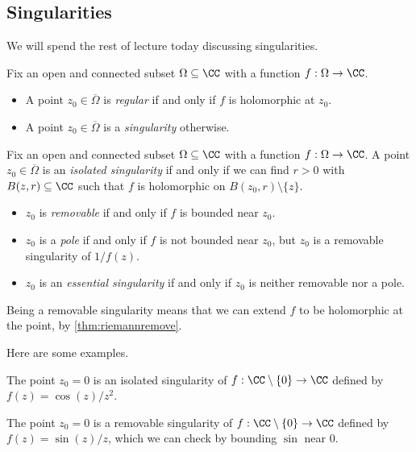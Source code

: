 \subsection{Singularities}
We will spend the rest of lecture today discussing singularities.
\begin{definition}
	Fix an open and connected subset $\Omega\subseteq\CC$ with a function $f:\Omega\to\CC$.
	\begin{itemize}
		\item A point $z_0\in\overline\Omega$ is \textit{regular} if and only if $f$ is holomorphic at $z_0$.
		\item A point $z_0\in\overline\Omega$ is a \textit{singularity} otherwise.
	\end{itemize}
\end{definition}
\begin{definition}   
	Fix an open and connected subset $\Omega\subseteq\CC$ with a function $f:\Omega\to\CC$. A point $z_0\in\overline\Omega$ is an \textit{isolated singularity} if and only if we can find $r>0$ with $B(z,r)\subseteq\CC$ such that $f$ is holomorphic on $B(z_0,r)\setminus\{z\}$.
	\begin{itemize}
		\item $z_0$ is \textit{removable} if and only if $f$ is bounded near $z_0$.
		\item $z_0$ is a \textit{pole} if and only if $f$ is not bounded near $z_0$, but $z_0$ is a removable singularity of $1/f(z)$.
		\item $z_0$ is an \textit{essential singularity} if and only if $z_0$ is neither removable nor a pole.
	\end{itemize}
\end{definition}
\begin{remark}
	Being a removable singularity means that we can extend $f$ to be holomorphic at the point, by \autoref{thm:riemannremove}.
\end{remark}
Here are some examples.
\begin{example}
	The point $z_0=0$ is an isolated singularity of $f:\CC\setminus\{0\}\to\CC$ defined by $f(z)=\cos(z)/z^2$.
\end{example}
\begin{example}
	The point $z_0=0$ is a removable singularity of $f:\CC\setminus\{0\}\to\CC$ defined by $f(z)=\sin(z)/z$, which we can check by bounding $\sin$ near $0$.
\end{example}
